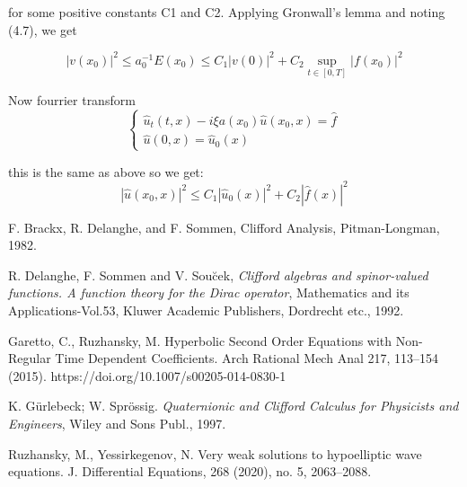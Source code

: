 \documentclass[12pt]{amsart}
\newcommand{\x}{x}
\newcommand{\norm}[1]{|#1|}
\theoremstyle{definition}
\begin{document}
for some positive constants C1 and C2. Applying Gronwall’s lemma and noting (4.7),
we get

\[\norm{v (x_0)}^2 \leq a_0^{-1}E(x_0) \leq C_1\norm{v (0)}^2 +  C_2\sup_{t \in [0,T]}\norm{f(x_0)}^2\]

Now fourrier transform
\[
\begin{cases}
\hat{u}_t(t, \x) -i\xi a(x_0)\hat{u}(x_0, \x) = \hat{f}\\
\hat{u}(0, \x) = \hat{u}_0(\x)
\end{cases}
\]

this is the same as above so we get:
\[\norm{\hat{u}(x_0, \x)}^2 \leq C_1\norm{\hat{u}_0(\x)}^2 + C_2\norm{\hat{f}(\x)}^2\]

\hrulefill


\begin{thebibliography}{2025}

 F. Brackx, R. Delanghe, and F. Sommen, Clifford Analysis, Pitman-Longman, 1982.

R. Delanghe, F. Sommen and V. Sou\u{c}ek, \textit{Clifford algebras and spinor-valued functions. A function theory for the Dirac operator}, Mathematics and its Applications-Vol.53, Kluwer Academic Publishers,
Dordrecht etc., 1992.


Garetto, C., Ruzhansky, M. Hyperbolic Second Order Equations with Non-Regular Time Dependent Coefficients. Arch Rational Mech Anal 217, 113–154 (2015). https://doi.org/10.1007/s00205-014-0830-1

 K. G\"urlebeck; W. Spr\"ossig. \textit{Quaternionic and Clifford Calculus for Physicists and Engineers}, Wiley and Sons Publ., 1997.	


Ruzhansky, M.,  Yessirkegenov, N.  Very weak solutions to hypoelliptic wave equations. J. Differential Equations, 268 (2020), no. 5, 2063–2088.
\end{thebibliography}
\end{document}
